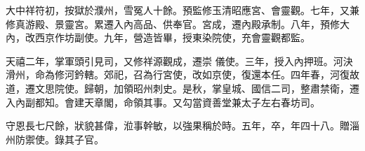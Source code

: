 \begin{pinyinscope}
 大中祥符初，按獄於濮州，雪冤人十餘。預監修玉清昭應宮、會靈觀。七年，又兼修真游殿、景靈宮。累遷入內高品、供奉官。宮成，遷內殿承制。八年，預修大內，改西京作坊副使。九年，營造皆畢，授東染院使，充會靈觀都監。



 天禧二年，掌軍頭引見司，又修祥源觀成，遷崇
 儀使。三年，授入內押班。河決滑州，命為修河鈐轄。郊祀，召為行宮使，改如京使，復還本任。四年春，河復故道，遷文思院使。歸朝，加領昭州刺史。是秋，掌皇城、國信二司，整肅禁衛，遷入內副都知。會建天章閣，命領其事。又勾當資善堂兼太子左右春坊司。



 守恩長七尺餘，狀貌甚偉，涖事幹敏，以強果稱於時。五年，卒，年四十八。贈淄州防禦使。錄其子官。



\end{pinyinscope}